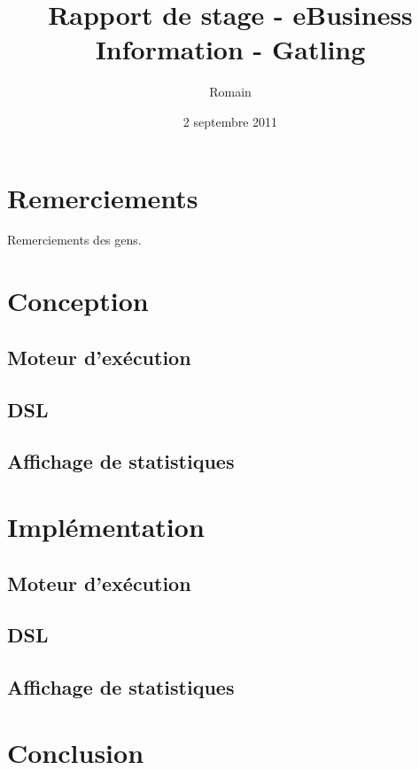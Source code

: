 \documentclass[12pt]{book}
\title{Rapport de stage - eBusiness Information - Gatling}
\author{Romain \bsc{Sertelon}}
\date{2 septembre 2011}
\begin{document}
\maketitle


\frontmatter

\chapter{Remerciements}
Remerciements des gens.
  
\tableofcontents


\mainmatter








\chapter{Conception}
\section{Moteur d'exécution}
\section{DSL}
\section{Affichage de statistiques}
  
\chapter{Implémentation}
\section{Moteur d'exécution}
\section{DSL}
\section{Affichage de statistiques}
  
\chapter{Conclusion}
  
\end{document}

